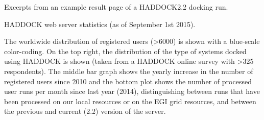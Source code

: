 \caption{Excerpts from an example result page of a HADDOCK2.2 docking run.}
{}
\stopbuffer


\caption{HADDOCK web server statistics (as of September 1st 2015).}
{The worldwide distribution of registered users (>6000) is shown with a
blue-scale color-coding. On the top right, the distribution of the type of
systems docked using HADDOCK is shown (taken from a HADDOCK online survey with
>325 respondents). The middle bar graph shows the yearly increase in the number
of registered users since 2010 and the bottom plot shows the number of
processed user runs per month since last year (2014), distinguishing between
runs that have been processed on our local resources or on the EGI grid
resources, and between the previous and current (2.2) version of the server.}
\stopbuffer
